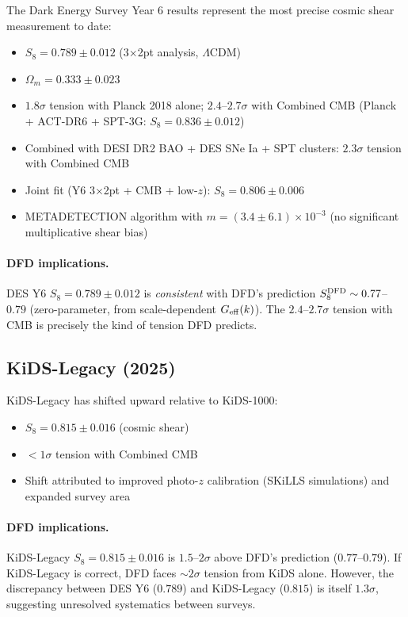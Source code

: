 \documentclass[11pt,a4paper]{article}
\newcommand{\LCDM}{$\Lambda$CDM}
\newcommand{\Geff}{G_{\rm eff}}
\begin{document}
The Dark Energy Survey Year 6 results represent the most precise cosmic
shear measurement to date:
\begin{itemize}
\item $S_8 = 0.789 \pm 0.012$ (3$\times$2pt analysis, \LCDM)
\item $\Omega_m = 0.333 \pm 0.023$
\item $1.8\sigma$ tension with Planck 2018 alone; $2.4$--$2.7\sigma$
  with Combined CMB (Planck + ACT-DR6 + SPT-3G: $S_8 = 0.836 \pm 0.012$)
\item Combined with DESI DR2 BAO + DES SNe Ia + SPT clusters:
  $2.3\sigma$ tension with Combined CMB
\item Joint fit (Y6 3$\times$2pt + CMB + low-$z$): $S_8 = 0.806 \pm 0.006$
\item METADETECTION algorithm with $m = (3.4 \pm 6.1) \times 10^{-3}$ (no
  significant multiplicative shear bias)
\end{itemize}

\paragraph{DFD implications.}
DES Y6 $S_8 = 0.789 \pm 0.012$ is \emph{consistent} with DFD's prediction
$S_8^{\rm DFD} \sim 0.77$--$0.79$ (zero-parameter, from scale-dependent
$\Geff(k)$).  The $2.4$--$2.7\sigma$ tension with CMB is precisely the
kind of tension DFD predicts.

\subsection{KiDS-Legacy (2025)}

KiDS-Legacy has shifted upward relative to KiDS-1000:
\begin{itemize}
\item $S_8 = 0.815 \pm 0.016$ (cosmic shear)
\item $< 1\sigma$ tension with Combined CMB
\item Shift attributed to improved photo-$z$ calibration (SKiLLS simulations)
  and expanded survey area
\end{itemize}

\paragraph{DFD implications.}
KiDS-Legacy $S_8 = 0.815 \pm 0.016$ is $1.5$--$2\sigma$ above DFD's
prediction ($0.77$--$0.79$).  If KiDS-Legacy is correct, DFD faces $\sim 2\sigma$
tension from KiDS alone.  However, the discrepancy between DES Y6 ($0.789$)
and KiDS-Legacy ($0.815$) is itself $1.3\sigma$, suggesting unresolved
systematics between surveys.
\end{document}
